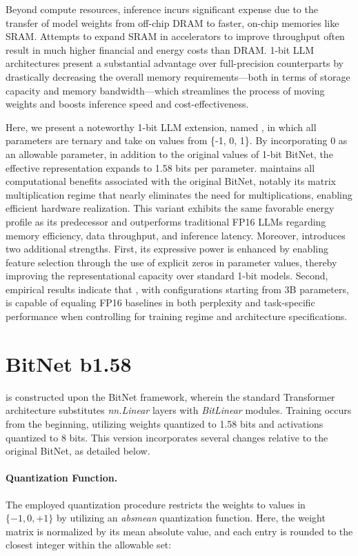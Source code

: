 Beyond compute resources, inference incurs significant expense due to the transfer of model weights from off-chip DRAM to faster, on-chip memories like SRAM. Attempts to expand SRAM in accelerators to improve throughput often result in much higher financial and energy costs than DRAM. 1-bit LLM architectures present a substantial advantage over full-precision counterparts by drastically decreasing the overall memory requirements—both in terms of storage capacity and memory bandwidth—which streamlines the process of moving weights and boosts inference speed and cost-effectiveness.

Here, we present a noteworthy 1-bit LLM extension, named \textbf{}, in which all parameters are ternary and take on values from \{-1, 0, 1\}. By incorporating 0 as an allowable parameter, in addition to the original values of 1-bit BitNet, the effective representation expands to 1.58 bits per parameter.  maintains all computational benefits associated with the original BitNet, notably its matrix multiplication regime that nearly eliminates the need for multiplications, enabling efficient hardware realization. This variant exhibits the same favorable energy profile as its predecessor and outperforms traditional FP16 LLMs regarding memory efficiency, data throughput, and inference latency. Moreover,  introduces two additional strengths. First, its expressive power is enhanced by enabling feature selection through the use of explicit zeros in parameter values, thereby improving the representational capacity over standard 1-bit models. Second, empirical results indicate that , with configurations starting from 3B parameters, is capable of equaling FP16 baselines in both perplexity and task-specific performance when controlling for training regime and architecture specifications.

\section{BitNet b1.58}

 is constructed upon the BitNet framework, wherein the standard Transformer architecture substitutes \emph{nn.Linear} layers with \emph{BitLinear} modules. Training occurs from the beginning, utilizing weights quantized to 1.58 bits and activations quantized to 8 bits. This version incorporates several changes relative to the original BitNet, as detailed below.

\paragraph{Quantization Function.} The employed quantization procedure restricts the weights to values in $\{-1, 0, +1\}$ by utilizing an \emph{absmean} quantization function. Here, the weight matrix is normalized by its mean absolute value, and each entry is rounded to the closest integer within the allowable set:

